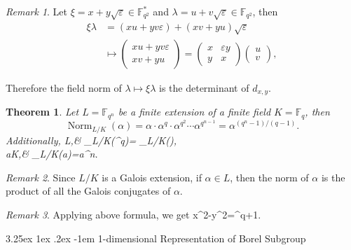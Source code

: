 \documentclass[12pt, letterpaper]{article}
\makeatletter
\newcommand{\field}{\mathbb{F}}
\newenvironment{eqlong}{\equation\aligned}{\endaligned\endequation}
\newtheorem{thm}[prop]{Theorem}
\renewcommand\paragraph{\@startsection{paragraph}{4}{\z@}%
	{3.25ex \@plus1ex \@minus.2ex}%
	{-1em}%
	{\normalfont\normalsize\bfseries}}
\theoremstyle{definition}
\theoremstyle{remark}
\newtheorem*{rem*}{Remark}
\theoremstyle{definition}
\theoremstyle{plain}
\numberwithin{equation}{section}
\makeatother
\begin{document}
	\begin{rem*}
		Let $\xi=x+y\sqrt{\varepsilon}\in\field_{q^2}^*$ and $\lambda=u+v\sqrt{\varepsilon}\in\field_{q^2}$,
		then
		\[ \begin{aligned}
				\xi\lambda&=(xu+yv\varepsilon) + (xv+yu)\sqrt{\varepsilon}\\
				&\mapsto
				\begin{pmatrix}
					xu+yv\varepsilon\\
					xv+yu
				\end{pmatrix}=
				\begin{pmatrix}
					x&\varepsilon y\\y&x
				\end{pmatrix}\begin{pmatrix}
					u\\v
				\end{pmatrix},
			\end{aligned}
		\]
		
		Therefore the field norm of $\lambda\mapsto\xi\lambda$ is
		the determinant of $d_{x,y}$.
	\end{rem*}
	\begin{thm}
		Let $L = \field_{q^n}$ be a finite extension of a finite field $K = \field_q$, then
		\[\operatorname {Norm} _{L/K}(\alpha )=\alpha \cdot \alpha ^{q}\cdot \alpha ^{q^{2}}\cdots \alpha ^{q^{n-1}}=\alpha ^{(q^{n}-1)/(q-1)}.\]
		Additionally,
		\begin{eqlong}
			\forall \alpha \in L,&\quad {} _{L/K}(\alpha ^{q})= _{L/K}(\alpha ),\\
			\forall a\in K,&\quad {} _{L/K}(a)=a^{n}.\\
		\end{eqlong}
	\end{thm}
	\begin{rem*}
		Since $L/K$ is a Galois extension,
		if $\alpha\in L$, then the norm of $\alpha$ is the product of all the Galois conjugates of $\alpha$.
	\end{rem*}
	\begin{rem*}
		Applying above formula, we get 
		\begin{eqlong}\label{eqx2ey2=xiq+1}
			x^2-\varepsilon y^2=\xi^{q+1}.
		\end{eqlong}
	\end{rem*}

	\paragraph{1-dimensional Representation of Borel Subgroup}
	
\end{document}
